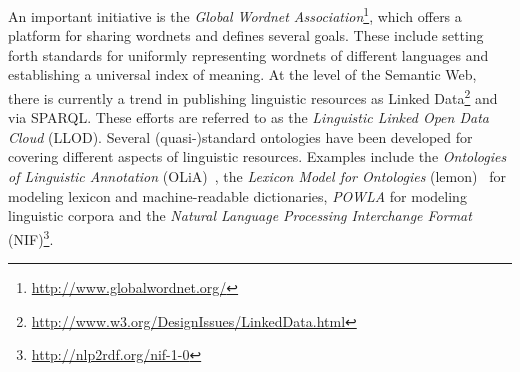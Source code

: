 \documentclass[sw]{iosart2c}
\newcommand*{\origtodo}{}
\let\origtodo\todo
\renewcommand*{\todo}{\origtodo[inline]}
\begin{document}
An important initiative is the
\emph{Global Wordnet Association}\footnote{\url{http://www.globalwordnet.org/}},
which offers a platform for sharing wordnets and defines several goals.
These include setting forth standards for uniformly representing wordnets
of different languages and establishing a universal index of meaning.
%
%
%
At the level of the Semantic Web, there is currently a trend in publishing linguistic resources
as Linked Data\footnote{\url{http://www.w3.org/DesignIssues/LinkedData.html}} and via SPARQL.
These efforts are referred to as the \emph{Linguistic Linked Open Data Cloud} (LLOD). 
Several (quasi-)standard ontologies have been developed for covering different aspects of linguistic resources.
Examples include the \emph{Ontologies of Linguistic Annotation} (OLiA)~\cite{olia2010},
the \emph{Lexicon Model for Ontologies} (lemon)~\cite{lemon2011} for modeling lexicon and machine-readable dictionaries,
\emph{POWLA} for modeling linguistic corpora\cite{powla2012}
and the \emph{Natural Language Processing Interchange Format} (NIF)\footnote{\url{http://nlp2rdf.org/nif-1-0}}.

\end{document}
